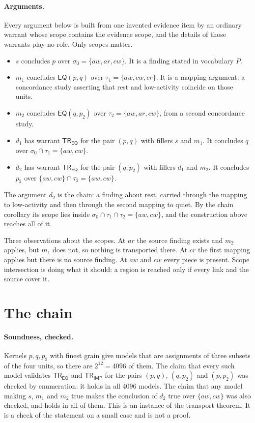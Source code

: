 \documentclass[11pt]{article}
\newcommand{\EQ}{\mathsf{EQ}}
\newcommand{\IMP}{\mathsf{IMP}}
\newcommand{\TR}{\mathsf{TR}}
\begin{document}
\paragraph{Arguments.} Every argument below is built from one invented evidence item by an ordinary warrant whose scope contains the evidence scope, and the details of those warrants play no role. Only scopes matter.
\begin{itemize}[nosep]
\item $s$ concludes $p$ over $\sigma_0=\{aw,ar,cw\}$. It is a finding stated in vocabulary $P$.
\item $m_1$ concludes $\EQ(p,q)$ over $\tau_1=\{aw,cw,cr\}$. It is a mapping argument: a concordance study asserting that rest and low-activity coincide on those units.
\item $m_2$ concludes $\EQ(q,p_2)$ over $\tau_2=\{aw,ar,cw\}$, from a second concordance study.
\item $d_1$ has warrant $\TR_{\EQ}$ for the pair $(p,q)$ with fillers $s$ and $m_1$. It concludes $q$ over $\sigma_0\cap\tau_1=\{aw,cw\}$.
\item $d_2$ has warrant $\TR_{\EQ}$ for the pair $(q,p_2)$ with fillers $d_1$ and $m_2$. It concludes $p_2$ over $\{aw,cw\}\cap\tau_2=\{aw,cw\}$.
\end{itemize}
The argument $d_2$ is the chain: a finding about rest, carried through the mapping to low-activity and then through the second mapping to quiet. By the chain corollary its scope lies inside $\sigma_0\cap\tau_1\cap\tau_2=\{aw,cw\}$, and the construction above reaches all of it.

Three observations about the scopes. At $ar$ the source finding exists and $m_2$ applies, but $m_1$ does not, so nothing is transported there. At $cr$ the first mapping applies but there is no source finding. At $aw$ and $cw$ every piece is present. Scope intersection is doing what it should: a region is reached only if every link and the source cover it.

\section{The chain}\label{sec:chain}

\paragraph{Soundness, checked.} Kernels $p,q,p_2$ with finest grain give models that are assignments of three subsets of the four units, so there are $2^{12}=4096$ of them. The claim that every such model validates $\TR_{\EQ}$ and $\TR_{\IMP}$ for the pairs $(p,q)$, $(q,p_2)$ and $(p,p_2)$ was checked by enumeration: it holds in all 4096 models. The claim that any model making $s$, $m_1$ and $m_2$ true makes the conclusion of $d_2$ true over $\{aw,cw\}$ was also checked, and holds in all of them. This is an instance of the transport theorem. It is a check of the statement on a small case and is not a proof.
\end{document}
